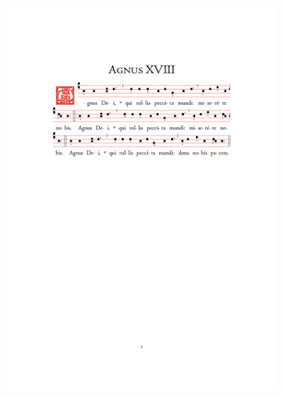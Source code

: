 \documentclass[10pt,a5]{article}
\begin{document}
\begin{figure}[h!]
	\centering
	\includegraphics[trim = 35mm 175mm 35.5mm 35mm, clip, width = 0.8\textwidth]{scores/Agnus-XVIII.pdf}
\end{figure}
\end{document}
